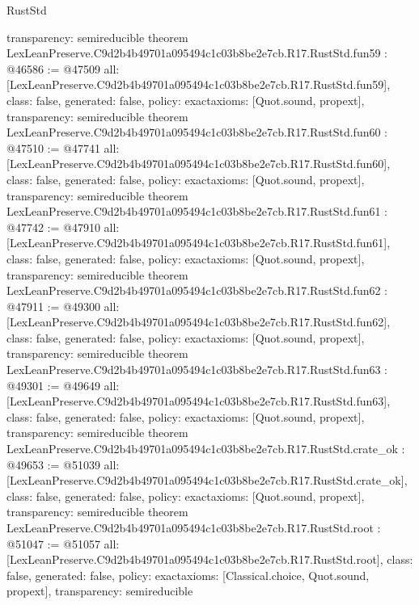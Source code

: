 \begin{lexlean}{RustStd}
\begin{coremodule}
{  transparency: semireducible
}
theorem LexLeanPreserve.C9d2b4b49701a095494c1c03b8be2e7cb.R17.RustStd.fun59 : @46586 := @47509 {
  all: [LexLeanPreserve.C9d2b4b49701a095494c1c03b8be2e7cb.R17.RustStd.fun59],
  class: false,
  generated: false,
  policy: exact{axioms: [Quot.sound, propext]},
  transparency: semireducible
}
theorem LexLeanPreserve.C9d2b4b49701a095494c1c03b8be2e7cb.R17.RustStd.fun60 : @47510 := @47741 {
  all: [LexLeanPreserve.C9d2b4b49701a095494c1c03b8be2e7cb.R17.RustStd.fun60],
  class: false,
  generated: false,
  policy: exact{axioms: [Quot.sound, propext]},
  transparency: semireducible
}
theorem LexLeanPreserve.C9d2b4b49701a095494c1c03b8be2e7cb.R17.RustStd.fun61 : @47742 := @47910 {
  all: [LexLeanPreserve.C9d2b4b49701a095494c1c03b8be2e7cb.R17.RustStd.fun61],
  class: false,
  generated: false,
  policy: exact{axioms: [Quot.sound, propext]},
  transparency: semireducible
}
theorem LexLeanPreserve.C9d2b4b49701a095494c1c03b8be2e7cb.R17.RustStd.fun62 : @47911 := @49300 {
  all: [LexLeanPreserve.C9d2b4b49701a095494c1c03b8be2e7cb.R17.RustStd.fun62],
  class: false,
  generated: false,
  policy: exact{axioms: [Quot.sound, propext]},
  transparency: semireducible
}
theorem LexLeanPreserve.C9d2b4b49701a095494c1c03b8be2e7cb.R17.RustStd.fun63 : @49301 := @49649 {
  all: [LexLeanPreserve.C9d2b4b49701a095494c1c03b8be2e7cb.R17.RustStd.fun63],
  class: false,
  generated: false,
  policy: exact{axioms: [Quot.sound, propext]},
  transparency: semireducible
}
theorem LexLeanPreserve.C9d2b4b49701a095494c1c03b8be2e7cb.R17.RustStd.crate_ok : @49653 := @51039 {
  all: [LexLeanPreserve.C9d2b4b49701a095494c1c03b8be2e7cb.R17.RustStd.crate_ok],
  class: false,
  generated: false,
  policy: exact{axioms: [Quot.sound, propext]},
  transparency: semireducible
}
theorem LexLeanPreserve.C9d2b4b49701a095494c1c03b8be2e7cb.R17.RustStd.root : @51047 := @51057 {
  all: [LexLeanPreserve.C9d2b4b49701a095494c1c03b8be2e7cb.R17.RustStd.root],
  class: false,
  generated: false,
  policy: exact{axioms: [Classical.choice, Quot.sound, propext]},
  transparency: semireducible
}


\end{coremodule}
\end{lexlean}
